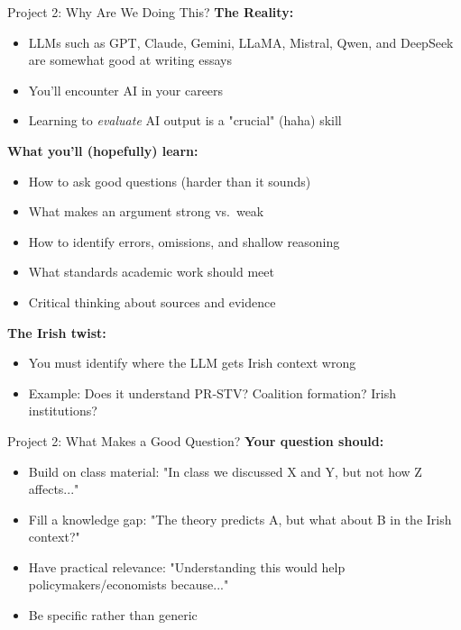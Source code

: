 \documentclass[10pt]{beamer}
\begin{document}
\begin{frame}{Project 2: Why Are We Doing This?}
\textbf{The Reality:}
\begin{itemize}
\item LLMs such as GPT, Claude, Gemini, LLaMA, Mistral, Qwen, and DeepSeek are somewhat good at writing essays
\item You'll encounter AI in your careers
\item Learning to \textit{evaluate} AI output is a "crucial" (haha) skill
\end{itemize}


\textbf{What you'll (hopefully) learn:}
\begin{itemize}
\item How to ask good questions (harder than it sounds)
\item What makes an argument strong vs.\ weak
\item How to identify errors, omissions, and shallow reasoning
\item What standards academic work should meet
\item Critical thinking about sources and evidence
\end{itemize}

\textbf{The Irish twist:}
\begin{itemize}
\item You must identify where the LLM gets Irish context wrong
\item Example: Does it understand PR-STV? Coalition formation? Irish institutions?
\end{itemize}
\end{frame}

\begin{frame}{Project 2: What Makes a Good Question?}
\textbf{Your question should:}
\begin{itemize}
\item Build on class material: "In class we discussed X and Y, but not how Z affects..."
\item Fill a knowledge gap: "The theory predicts A, but what about B in the Irish context?"
\item Have practical relevance: "Understanding this would help policymakers/economists because..."
\item Be specific rather than generic
\end{itemize}
\end{frame}
\end{document}
